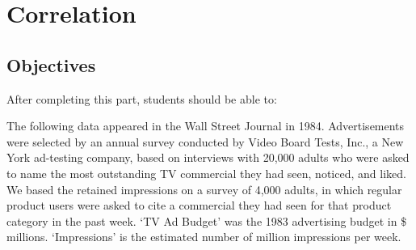 \documentclass[11pt, chapterprefix=true]{scrbook}\usepackage[]{graphicx}\usepackage[]{color}
\begin{document}

\chapter{Correlation}
\label{chap:ch15}

\section{Objectives}

After completing this part, students should be able to:


The following data appeared in the Wall Street Journal in 1984.  Advertisements were selected by an annual survey conducted by Video Board Tests, Inc., a New York ad-testing company, based on interviews with 20,000 adults who were asked to name the most outstanding TV commercial they had seen, noticed, and liked. We based the retained impressions on a survey of 4,000 adults, in which regular product users were asked to cite a commercial they had seen for that product category in the past week.  `TV Ad Budget' was the 1983 advertising budget in \$ millions.  `Impressions' is the estimated number of million impressions per week.
\end{document}
